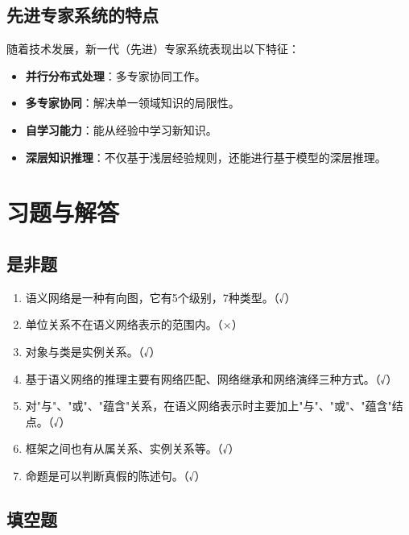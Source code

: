 \subsection{先进专家系统的特点}

随着技术发展，新一代（先进）专家系统表现出以下特征：
\begin{itemize}[leftmargin=2em,itemsep=0pt]
    \item \textbf{并行分布式处理}：多专家协同工作。
    \item \textbf{多专家协同}：解决单一领域知识的局限性。
    \item \textbf{自学习能力}：能从经验中学习新知识。
    \item \textbf{深层知识推理}：不仅基于浅层经验规则，还能进行基于模型的深层推理。
\end{itemize}

\section{习题与解答}

\subsection{是非题}

\begin{enumerate}[leftmargin=2em,itemsep=2pt]
    \item 语义网络是一种有向图，它有5个级别，7种类型。（√）
    \item 单位关系不在语义网络表示的范围内。（×）
    \item 对象与类是实例关系。（√）
    \item 基于语义网络的推理主要有网络匹配、网络继承和网络演绎三种方式。（√）
    \item 对"与"、"或"、"蕴含"关系，在语义网络表示时主要加上"与"、"或"、"蕴含"结点。（√）
    \item 框架之间也有从属关系、实例关系等。（√）
    \item 命题是可以判断真假的陈述句。（√）
\end{enumerate}

\subsection{填空题}

